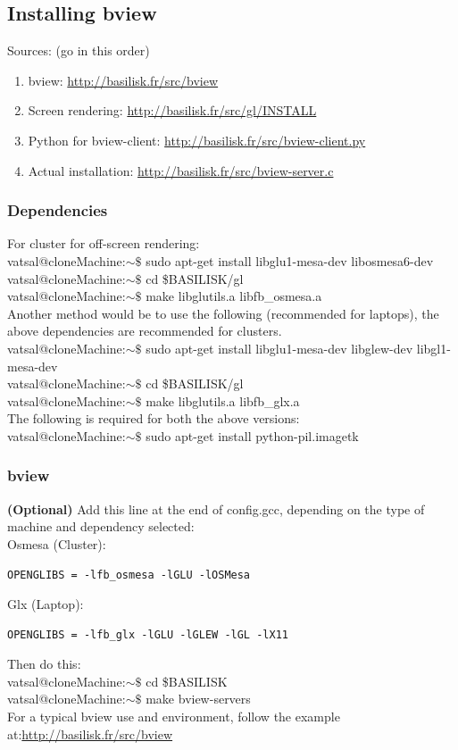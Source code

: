 \documentclass[]{article}
\newcommand\Colorhref[3][blue]{\href{#2}{\color{#1}#3}}
\begin{document}
\subsection{Installing bview}
Sources: (go in this order)
\begin{enumerate}
\item bview: \Colorhref{http://basilisk.fr/src/bview}{http://basilisk.fr/src/bview}
\item Screen rendering: \Colorhref{http://basilisk.fr/src/gl/INSTALL}{http://basilisk.fr/src/gl/INSTALL}
\item Python for bview-client: \Colorhref{http://basilisk.fr/src/bview-client.py}{http://basilisk.fr/src/bview-client.py}
\item Actual installation: \Colorhref{http://basilisk.fr/src/bview-server.c}{http://basilisk.fr/src/bview-server.c}
\end{enumerate}
\subsubsection{Dependencies}
For cluster for off-screen rendering:\\
{\color{red}vatsal@cloneMachine:$\sim\$$} sudo apt-get install libglu1-mesa-dev libosmesa6-dev\\
{\color{red}vatsal@cloneMachine:$\sim\$$} cd \$BASILISK/gl\\
{\color{red}vatsal@cloneMachine:$\sim\$$} make libglutils.a libfb\_osmesa.a\\
Another method would be to use the following (recommended for laptops), the above dependencies are recommended for clusters.\\
{\color{red}vatsal@cloneMachine:$\sim\$$} sudo apt-get install libglu1-mesa-dev libglew-dev libgl1-mesa-dev\\
{\color{red}vatsal@cloneMachine:$\sim\$$} cd \$BASILISK/gl\\
{\color{red}vatsal@cloneMachine:$\sim\$$} make libglutils.a libfb\_glx.a\\
The following is required for both the above versions:\\
{\color{red}vatsal@cloneMachine:$\sim\$$} sudo apt-get install python-pil.imagetk
\subsubsection{bview}
\textbf{(Optional)} Add this line at the end of config.gcc, depending on the type of machine and dependency selected:\\
Osmesa (Cluster):
\begin{verbatim}
OPENGLIBS = -lfb_osmesa -lGLU -lOSMesa
\end{verbatim}
Glx (Laptop):
\begin{verbatim}
OPENGLIBS = -lfb_glx -lGLU -lGLEW -lGL -lX11
\end{verbatim}
Then do this:\\
{\color{red}vatsal@cloneMachine:$\sim\$$} cd \$BASILISK\\
{\color{red}vatsal@cloneMachine:$\sim\$$} make bview-servers\\
For a typical bview use and environment, follow the example at:\Colorhref{http://basilisk.fr/src/bview}{http://basilisk.fr/src/bview}
\end{document}
